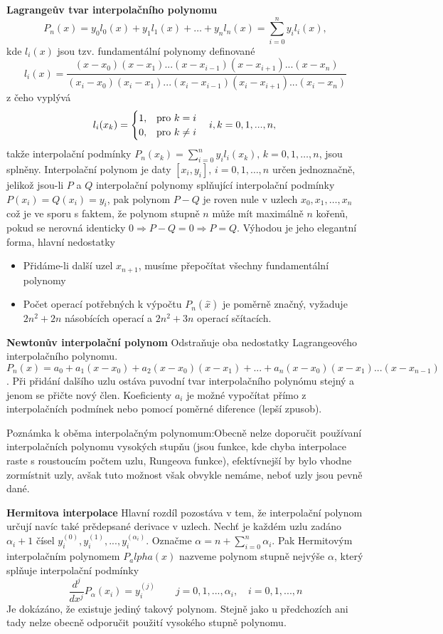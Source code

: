 \documentclass[a4]{report}
\theoremstyle{definition}
\begin{document}
{\textbf{Lagrangeův tvar interpolačního polynomu}
$$P_n(x)=y_0l_0(x)+y_1l_1(x)+\ldots+y_nl_n(x)=\sum_{i=0}^{n}y_il_i(x),$$
kde $l_i(x)$ jsou tzv. fundamentální polynomy definované $$l_i(x)=\frac{(x-x_0)(x-x_1)...(x-x_{i-1})(x-x_{i+1})...(x-x_n)}{(x_i-x_0)(x_i-x_1)...(x_i-x_{i-1})(x_i-x_{i+1})...(x_i-x_n)}$$ z čeho vyplývá
\[
    l_i(x_k)= 
\begin{cases}
        1, & \text{pro } k=i\\
        0, & \text{pro } k\neq i
\end{cases}\quad  i,k=0,1,...,n,\\
\]
takže interpolační podmínky $P_n(x_k)=\sum_{i=0}^n y_il_i(x_k), \, k=0,1,\ldots,n$, jsou splněny. Interpolační polynom je daty $[x_i,y_i],\, i=0,1,\ldots, n$ určen jednoznačně, jelikož jsou-li $P$ a $Q$ interpolační polynomy splňující interpolační podmínky $P(x_i)=Q(x_i)=y_i$, pak polynom $P-Q$ je roven nule v uzlech $x_0,x_1,\ldots,x_n$ což je ve sporu s faktem, že polynom stupně $n$ může mít maximálně $n$ kořenů, pokud se nerovná identicky $0 \Rightarrow P-Q=0 \Rightarrow P=Q$. 
\newline Výhodou je jeho elegantní forma, hlavní nedostatky 
\begin{itemize}
\item Přidáme-li další uzel $x_{n+1}$, musíme přepočítat všechny fundamentální polynomy
\item Počet operací potřebných k výpočtu $P_n(\hat{x}) $ je poměrně značný, vyžaduje $2n^2+2n$ násobících operací a $2n^2+3n$ operací sčítacích.
\end{itemize}


\textbf{Newtonův interpolační polynom}\newline
Odstraňuje oba nedostatky Lagrangeového interpolačního polynomu.$$P_n(x)=a_0+a_1(x-x_0)+a_2(x-x_0)(x-x_1)+...+a_n(x-x_0)(x-x_1)...(x-x_{n-1})$$. Při přidání dalšího uzlu ostáva puvodní tvar interpolačního polynómu stejný a jenom se přičte nový člen. Koeficienty $a_i$ je možné vypočítat přímo z interpolačních podmínek nebo pomocí poměrné diference (lepší zpusob).

Poznámka k oběma interpolačným polynomum:Obecně nelze doporučit používaní interpolačních polynomu vysokých stupňu (jsou funkce, kde chyba interpolace raste s roustoucím počtem uzlu, Rungeova funkce), efektívnejší by bylo vhodne zormístnit uzly, avšak tuto možnost však obvykle nemáme, neboť uzly jsou pevně dané.

\textbf{Hermitova interpolace}\newline
Hlavní rozdíl pozostáva v tem, že interpolační polynom určují navíc také prědepsané derivace v uzlech. 
\newline
Nechť je každém uzlu zadáno $\alpha_i+1$ čísel $y_i^{(0)},y_i^{(1)},...,y_i^{(\alpha_i)}$. Označme $\alpha=n+\sum_{i=0}^n \alpha_i$. Pak Hermitovým interpolačním polynomem $P_alpha(x)$ nazveme polynom stupně nejvýše $\alpha$, který splňuje interpolační podmínky $$\frac{d^j}{dx^j}P_\alpha(x_i)=y_i^{(j)}\qquad j=0,1,...,\alpha_i,\quad i=0,1,...,n$$Je dokázáno, že existuje jediný takový polynom. Stejně jako u předchozích ani tady nelze obecně odporučit použití vysokého stupně polynomu.

}
\end{document}

